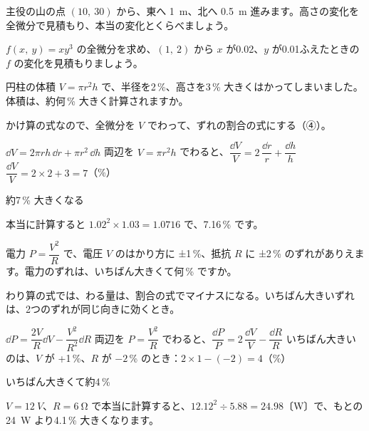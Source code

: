 \noindent\begin{minipage}[t]{0.49\linewidth}
\begin{jibun}
主役の山の点 $(10,\ 30)$ から、東へ \qty{1}{m}、北へ \qty{0.5}{m} 進みます。高さの変化を全微分で見積もり、本当の変化とくらべましょう。
\end{jibun}
\end{minipage}\hfill
\begin{minipage}[t]{0.49\linewidth}
\begin{jibun}
$f(x,\ y)=xy^3$ の全微分を求め、$(1,\ 2)$ から $x$ が0.02、$y$ が0.01ふえたときの $f$ の変化を見積もりましょう。
\end{jibun}
\end{minipage}\par

\begin{reidai}
円柱の体積 $V=\pi r^2h$ で、半径を2\,\%、高さを3\,\% 大きくはかってしまいました。体積は、約何\,\% 大きく計算されますか。\par
\kangaekata かけ算の式なので、全微分を $V$ でわって、ずれの割合の式にする（④）。\par
\shiki $\dd V=2\pi rh\,\dd r+\pi r^2\,\dd h$\kviiidq
両辺を $V=\pi r^2h$ でわると、$\dfrac{\dd V}{V}=2\,\dfrac{\dd r}{r}+\dfrac{\dd h}{h}$\kviiidq
$\dfrac{\dd V}{V}=2\times2+3=7$（\%）\par
\kotae 約7\,\% 大きくなる
\end{reidai}
\noindent 本当に計算すると $1.02^2\times1.03=1.0716$ で、7.16\,\% です。

\begin{reidai}
電力 $P=\dfrac{V^2}{R}$ で、電圧 $V$ のはかり方に ±1\,\%、抵抗 $R$ に ±2\,\% のずれがありえます。電力のずれは、いちばん大きくて何\,\% ですか。\par
\kangaekata わり算の式では、わる量は、割合の式でマイナスになる。いちばん大きいずれは、2つのずれが同じ向きに効くとき。\par
\shiki $\dd P=\dfrac{2V}{R}\dd V-\dfrac{V^2}{R^2}\dd R$\kviiidq
両辺を $P=\dfrac{V^2}{R}$ でわると、$\dfrac{\dd P}{P}=2\,\dfrac{\dd V}{V}-\dfrac{\dd R}{R}$\kviiidq
いちばん大きいのは、$V$ が +1\,\%、$R$ が $-2$\,\% のとき：$2\times1-(-2)=4$（\%）\par
\kotae いちばん大きくて約4\,\%
\end{reidai}
\noindent $V=\qty{12}{V}$、$R=\qty{6}{\ohm}$ で本当に計算すると、$12.12^2\div5.88=24.98$〔W〕で、もとの \qty{24}{W} より4.1\,\% 大きくなります。

